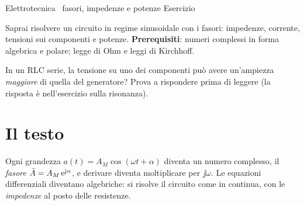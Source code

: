 \documentclass[10pt]{article}
\begin{document}
           {Elettrotecnica \textperiodcentered\ fasori, impedenze e potenze}
           {Esercizio}

\begin{obiettivi}
Saprai risolvere un circuito in regime sinusoidale con i fasori: impedenze, corrente, tensioni sui componenti e
potenze. \textbf{Prerequisiti}: numeri complessi in forma algebrica e polare; legge di Ohm e leggi di Kirchhoff.
\end{obiettivi}

\begin{previsione}
In un RLC serie, la tensione su uno dei componenti può avere un'ampiezza \emph{maggiore} di quella del
generatore? Prova a rispondere prima di leggere (la risposta è nell'esercizio sulla risonanza).
\end{previsione}

\section{Il testo}


\begin{idea}
Ogni grandezza $a(t) = A_M\cos(\omega t + \alpha)$ diventa un numero complesso, il \emph{fasore}
$\bar{A} = A_M\,\mathrm{e}^{\mathrm{j}\alpha}$, e derivare diventa moltiplicare per $\jj\omega$. Le equazioni differenziali
diventano algebriche: si risolve il circuito come in continua, con le \emph{impedenze} al posto delle resistenze.
\end{idea}
\end{document}
